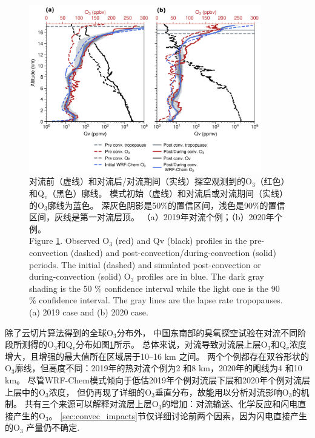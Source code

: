 \begin{figure}[H]
\centering
\includegraphics[width=0.9\textwidth]{./figures/ozonesonde_profile.png}
\caption{对流前（虚线）和对流后/对流期间（实线）探空观测到的O$_3$（红色）和Q$_v$（黑色）廓线。
模式初始（虚线）和对流后或对流期间（实线）的O$_3$廓线为蓝色。
深灰色阴影是50\%的置信区间，浅色是90\%的置信区间，灰线是第一对流层顶。
（a）2019年对流个例；（b）2020年个例。\\
Figure \ref{fig:ozonesonde_profile}. Observed O$_3$ (red) and Qv (black) profiles in the pre-convection (dashed) and post-convection/during-convection (solid) periods.
The initial (dashed) and simulated post-convection or during-convection (solid) O$_3$ profiles are in blue.
The dark gray shading is the 50 \% confidence interval while the light one is the 90 \% confidence interval.
The gray lines are the lapse rate tropopauses.
(a) 2019 case and (b) 2020 case.
}
\label{fig:ozonesonde_profile}
\end{figure}

除了云切片算法得到的全球O$_3$分布外，
中国东南部的臭氧探空试验在对流不同阶段所测得的O$_3$和Q$_v$分布如图\ref{fig:ozonesonde_profile}所示。
总体来说，对流导致对流层上层O$_3$和Q$_v$浓度增大，且增强的最大值所在区域居于10--16 km 之间。
两个个例都存在双谷形状的O$_3$廓线，但高度不同：2019年的热对流个例为2 和8 km，2020年的飑线为4 和10 km。
尽管WRF-Chem模式倾向于低估2019年个例对流层下层和2020年个例对流层上层中的O$_3$浓度，
但仍再现了详细的O$_3$垂直分布，故能用以分析对流影响O$_3$的机制。
共有三个来源可以解释对流层上层O$_3$的增加：对流输送、化学反应和闪电直接产生的O$_3$。
\ref{sec:convec_impacts}节仅详细讨论前两个因素，因为闪电直接产生的O$_3$
产量仍不确定\citep{Morris.2010,Ripoll.2014}.



